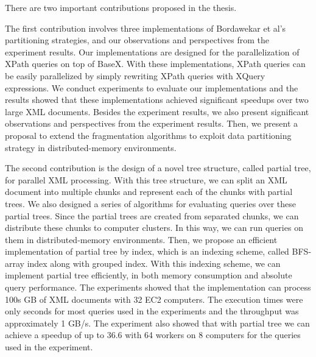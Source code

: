 \begin{abstracts}
There are two important contributions proposed in the thesis.

The first contribution involves three implementations of Bordawekar et al's
partitioning strategies, and our observations and perspectives from the
experiment results. Our implementations are designed for the parallelization of
XPath queries on top of BaseX. With these implementations, XPath queries can be
easily parallelized by simply rewriting XPath queries with XQuery expressions.
We conduct experiments to evaluate our implementations and the results showed
that these implementations achieved significant speedups over two large XML
documents. Besides the experiment results, we also present significant
observations and perspectives from the experiment results. Then, we present a
proposal to extend the fragmentation algorithms to exploit data partitioning
strategy in distributed-memory environments.

The second contribution is the design of a novel tree structure, called partial
tree, for parallel XML processing. With this tree structure, we can split an XML
document into multiple chunks and represent each of the chunks with partial
trees. We also designed a series of algorithms for evaluating queries over these
partial trees. Since the partial trees are created from separated chunks, we can
distribute these chunks to computer clusters. In this way, we can run queries on
them in distributed-memory environments. Then, we propose an efficient
implementation of partial tree by index, which is an indexing scheme, called
BFS-array index along with grouped index. With this indexing scheme, we can
implement partial tree efficiently, in both memory consumption and absolute
query performance. The experiments showed that the implementation can process
100s GB of XML documents with 32 EC2 computers. The execution times were only
seconds for most queries used in the experiments and the throughput was
approximately 1 GB/s. The experiment also showed that with partial tree we can
achieve a speedup of up to 36.6 with 64 workers on 8 computers for the queries
used in the experiment.

\end{abstracts}

\frontmatter
 

